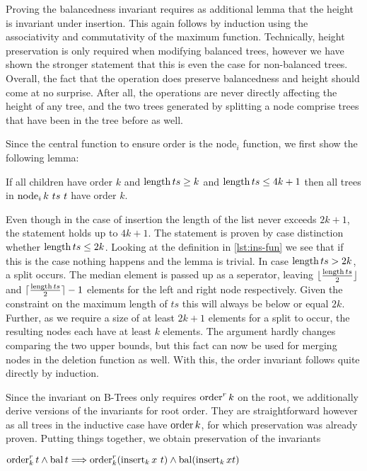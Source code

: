 Proving the balancedness invariant requires as additional lemma that
the height is invariant under insertion.
This again follows by induction using the
associativity and commutativity of the maximum function.
Technically, height preservation is only required when modifying balanced
trees, however we have shown the stronger statement that this is even the case for non-balanced trees.
Overall, the fact that the operation does preserve balancedness and height should come at no surprise.
After all, the operations are never directly affecting the height of any tree,
and the two trees generated by splitting a node comprise trees that have been in the tree before as well.

Since the central function to ensure order is the node$_i$ function,
we first show the following lemma:

\begin{lemma}
\label{lem:nodei-order}
    If all children have order $k$ and $\operatorname{length} ts \ge k$ and $\operatorname{length} ts \le 4k+1$
    then all trees in $\operatorname{node}_i k\ ts\ t$ have order $k$.
\end{lemma}

Even though in the case of insertion the length of the list
never exceeds $2k+1$, the statement holds up to $4k+1$.
The statement is proven by case distinction whether $\operatorname{length} ts \le 2k$.
Looking at the definition in \autoref{lst:ins-fun}
we see that if this is the case nothing happens and the lemma is trivial.
In case $\operatorname{length} ts > 2k$, a split occurs.
The median element is passed up as a seperator, leaving
$\lfloor\frac{\operatorname{length} ts}{2}\rfloor$ and $\lceil\frac{\operatorname{length} ts}{2}\rceil - 1$
elements for the left and right node respectively.
Given the constraint on the maximum length of $ts$
this will always be below or equal $2k$.
Further, as we require a size of at least $2k+1$ elements for a split to occur,
the resulting nodes each have at least $k$ elements.
The argument hardly changes comparing the two upper bounds,
but this fact can now be used for merging nodes in the deletion function as well.
With this, the order invariant follows quite directly by induction.

Since the invariant on B-Trees only requires $\operatorname{order}^r k$ on the
root, we additionally derive versions of the invariants
for root order.
They are straightforward however as all trees in the inductive case
have $\operatorname{order} k$, for which preservation was already proven.
Putting things together, we obtain preservation of the invariants

\begin{theorem}
    $\operatorname{order}^r_k t \wedge \operatorname{bal} t \Longrightarrow
    \operatorname{order}^r_k (\operatorname{insert}_k x\ t) \wedge \operatorname{bal} (\operatorname{insert}_k x t)$
\end{theorem}

